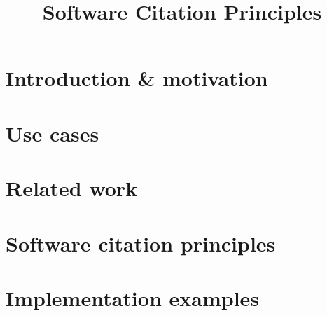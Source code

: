 \documentclass[11pt, oneside]{amsart}
\title{Software Citation Principles}
\author{}
\date{}
\begin{document}
\maketitle

\section{Introduction \& motivation}
\label{sec:intro}



\section{Use cases}
\label{sec:use_cases}



\section{Related work}
\label{sec:related_work}



\section{Software citation principles}
\label{sec:principles}



\section{Implementation examples}
\label{sec:examples}
\end{document}
